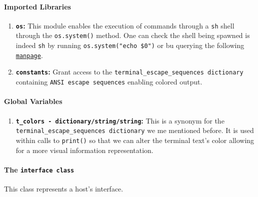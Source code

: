                 \paragraph{Imported Libraries}
                    \begin{enumerate}
                        \item \textbf{\texttt{os}:} This module enables the execution of commands through a \texttt{sh} shell through the \texttt{os.system()} method. One can check the shell being spawned is indeed \texttt{sh} by running \texttt{\allowbreak os.system("echo \$0")} or bu querying the following \href{https://linux.die.net/man/3/system}{\texttt{manpage}}.
                        \item \textbf{\texttt{constants}:} Grant access to the \texttt{\allowbreak terminal\_escape\_sequences dictionary} containing \texttt{ANSI escape sequences} enabling colored output.
                    \end{enumerate}

                \paragraph{Global Variables}
                    \begin{enumerate}
                        \item \textbf{\texttt{\allowbreak t\_colors - dictionary/string/string}:} This is a synonym for the \texttt{\allowbreak terminal\_escape\_sequences dictionary} we me mentioned before. It is used within calls to \texttt{print()} so that we can alter the terminal text's color allowing for a more visual information representation.
                    \end{enumerate}

                \paragraph{The \texttt{interface class}}
                    This class represents a host's interface.


